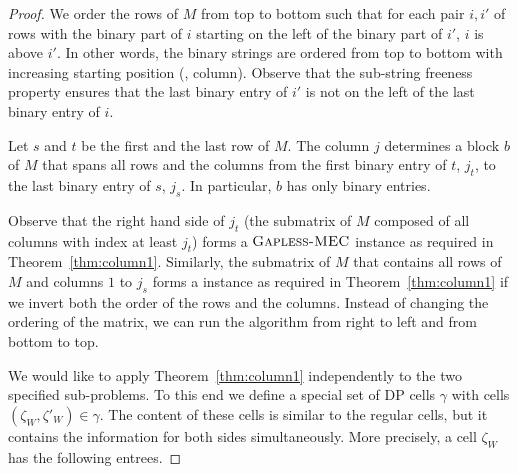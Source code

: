 \begin{proof}
    We order the rows of $M$ from top to bottom such that for each pair $i,i'$ of rows with the binary part of $i$ starting on the left of the binary part of $i'$, $i$ is above $i'$.
    In other words, the binary strings are ordered from top to bottom with increasing starting position (\ie, column).
    Observe that the sub-string freeness property ensures that the last binary entry of $i'$ is not on the left of the last binary entry of $i$.

    Let $s$ and $t$ be the first and the last row of $M$.
    The column $j$ determines a block $b$ of $M$ that spans all rows and the columns from the first binary entry of $t$, $j_t$, to the last binary entry of $s$, $j_s$.
    In particular, $b$ has only binary entries.

    Observe that the right hand side of $j_t$ (the submatrix of $M$ composed of all columns with index at least $j_t$) forms a $\textsc{Gapless-MEC}$ instance as required in Theorem~\ref{thm:column1}.
    Similarly, the submatrix of $M$ that contains all rows of $M$ and columns $1$ to $j_s$ forms a \GMEC instance as required in Theorem~\ref{thm:column1} if we invert both the order of the rows and the columns.
    Instead of changing the ordering of the matrix, we can run the algorithm from right to left and from bottom to top.

    We would like to apply Theorem~\ref{thm:column1} independently to the two specified sub-problems.
    To this end we define a special set of DP cells $\gamma$ with cells $(\zeta_W,\zeta'_W) \in \gamma$.
    The content of these cells is similar to the regular cells, but it contains the information for both sides simultaneously.
    More precisely, a cell $\zeta_W$ has the following entrees.


\end{proof}
